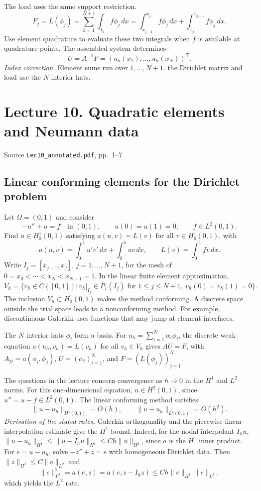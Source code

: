 \documentclass[11pt,a4paper]{article}
\newcommand{\lecturesource}[1]{%
  \par{\small\sffamily\color{Muted}#1}\par\vspace{0.15em}}
\begin{document}
The load uses the same support restriction.
\[
 F_j=L(\phi_j)
 =\sum_{k=1}^{N+1}\int_{I_k}f\phi_j\,dx
 =\int_{x_{j-1}}^{x_j}f\phi_j\,dx+
   \int_{x_j}^{x_{j+1}}f\phi_j\,dx .
\]
Use element quadrature to evaluate these two integrals when \(f\) is
available at quadrature points. The assembled system determines
\[
 U=A^{-1}F=(u_h(x_1),\ldots,u_h(x_N))^{\mathsf T}.
\]
\emph{Index correction.} Element sums run over \(1,\ldots,N+1\).
the Dirichlet matrix and load use the \(N\) interior hats.

\clearpage
\section{Lecture 10. Quadratic elements and Neumann data}
\lecturesource{Source \enspace\texttt{Lec10\_annotated.pdf}, pp.~1--7}

\subsection{Linear conforming elements for the Dirichlet problem}

Let \(\Omega=(0,1)\) and consider
\[
 -u''+u=f\quad\text{in }(0,1),\qquad
 u(0)=u(1)=0,\qquad f\in L^2(0,1).
\]
Find \(u\in H_0^1(0,1)\) satisfying \(a(u,v)=L(v)\) for all
\(v\in H_0^1(0,1)\), with
\[
 a(u,v)=\int_0^1u'v'\,dx+\int_0^1uv\,dx,\qquad L(v)=\int_0^1fv\,dx.
\]
Write \(I_j=[x_{j-1},x_j]\), \(j=1,\ldots,N+1\), for the mesh of
\(0=x_0<\cdots<x_N<x_{N+1}=1\). In the linear finite element approximation,
\[
 V_h=\bigl\{v_h\in C([0,1]):v_h|_{I_j}\in P_1(I_j)
 \text{ for }1\le j\le N+1,\ v_h(0)=v_h(1)=0\bigr\}.
\]
The inclusion \(V_h\subset H_0^1(0,1)\) makes the method conforming.
A discrete space outside the trial space leads to a nonconforming
method. For example, discontinuous Galerkin uses functions that may
jump at element interfaces.

The \(N\) interior hats \(\phi_i\) form a basis. For
\(u_h=\sum_{i=1}^N\alpha_i\phi_i\), the discrete weak equation
\(a(u_h,v_h)=L(v_h)\) for all \(v_h\in V_h\) gives \(AU=F\), with
\(A_{ji}=a(\phi_i,\phi_j)\), \(U=(\alpha_i)_{i=1}^N\), and
\(F=(L(\phi_j))_{j=1}^N\).

The questions in the lecture concern convergence as \(h\to0\) in the
\(H^1\) and \(L^2\) norms. For this one-dimensional equation,
\(u\in H^2(0,1)\), since \(u''=u-f\in L^2(0,1)\).
The linear conforming method satisfies
\[
 \|u-u_h\|_{H^1(0,1)}=O(h),\qquad
 \|u-u_h\|_{L^2(0,1)}=O(h^2).
\]
\emph{Derivation of the stated rates.} Galerkin orthogonality and the piecewise-linear interpolation estimate give
the \(H^1\) bound. Indeed, for the nodal interpolant \(I_hu\),
\(\|u-u_h\|_{H^1}\le\|u-I_hu\|_{H^1}\le Ch\|u\|_{H^2}\),
since \(a\) is the \(H^1\) inner product. For \(e=u-u_h\), solve
\(-z''+z=e\) with homogeneous Dirichlet data. Then
\(\|z\|_{H^2}\le C\|e\|_{L^2}\) and
\[
 \|e\|_{L^2}^2=a(e,z)=a(e,z-I_hz)
 \le Ch\|e\|_{H^1}\|e\|_{L^2},
\]
which yields the \(L^2\) rate.
\end{document}
